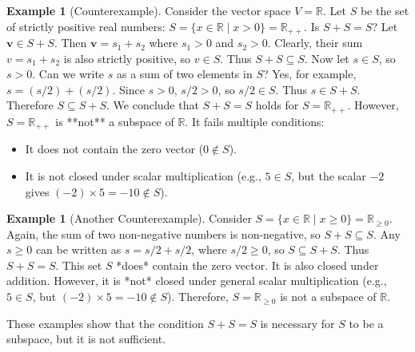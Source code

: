 \documentclass[11pt]{article}
\theoremstyle{definition}
\newtheorem{example}[theorem]{Example}
\theoremstyle{remark}
\newcommand{\R}{\mathbb{R}}
\newcommand{\vecv}{\mathbf{v}}
\begin{document}
\begin{example}[Counterexample]
Consider the vector space $V = \R$. Let $S$ be the set of strictly positive real numbers: $S = \{x \in \R \mid x > 0\} = \R_{++}$.
Is $S+S = S$? Let $\vecv \in S+S$. Then $\vecv = s_1 + s_2$ where $s_1 > 0$ and $s_2 > 0$. Clearly, their sum $v = s_1 + s_2$ is also strictly positive, so $v \in S$. Thus $S+S \subseteq S$. Now let $s \in S$, so $s > 0$. Can we write $s$ as a sum of two elements in $S$? Yes, for example, $s = (s/2) + (s/2)$. Since $s>0$, $s/2 > 0$, so $s/2 \in S$. Thus $s \in S+S$. Therefore $S \subseteq S+S$.
We conclude that $S+S = S$ holds for $S = \R_{++}$.
However, $S = \R_{++}$ is **not** a subspace of $\R$. It fails multiple conditions:
\begin{itemize}
    \item It does not contain the zero vector ($0 \notin S$).
    \item It is not closed under scalar multiplication (e.g., $5 \in S$, but the scalar $-2$ gives $(-2) \times 5 = -10 \notin S$).
\end{itemize}
\end{example}

\begin{example}[Another Counterexample]
Consider $S = \{x \in \R \mid x \ge 0\} = \R_{\ge 0}$.
Again, the sum of two non-negative numbers is non-negative, so $S+S \subseteq S$. Any $s \ge 0$ can be written as $s = s/2 + s/2$, where $s/2 \ge 0$, so $S \subseteq S+S$. Thus $S+S = S$.
This set $S$ *does* contain the zero vector. It is also closed under addition. However, it is *not* closed under general scalar multiplication (e.g., $5 \in S$, but $(-2) \times 5 = -10 \notin S$). Therefore, $S = \R_{\ge 0}$ is not a subspace of $\R$.
\end{example}

These examples show that the condition $S+S=S$ is necessary for $S$ to be a subspace, but it is not sufficient.
\end{document}
